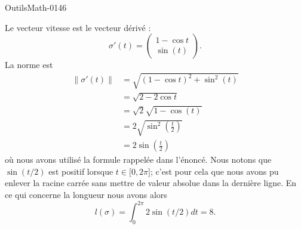 
\begin{corrige}{OutilsMath-0146}

    Le vecteur vitesse est le vecteur dérivé :
    \begin{equation}
        \sigma'(t)=\begin{pmatrix}
            1-\cos t    \\ 
            \sin(t)    
        \end{pmatrix}.
    \end{equation}
    La norme est
    \begin{subequations}
        \begin{align}
            \| \sigma'(t) \|&= \sqrt{(1-\cos t)^2+\sin^2(t)}\\
            &=\sqrt{2-2\cos t}\\
            &=\sqrt{2}\sqrt{1-\cos(t)}\\
            &=2\sqrt{\sin^2\left( \frac{ t }{ 2 } \right)}\\
            &=2\sin\left( \frac{ t }{2} \right)
        \end{align}
    \end{subequations}
    où nous avons utilisé la formule rappelée dans l'énoncé. Nous notons que \( \sin(t/2)\) est positif lorsque \( t\in\mathopen[ 0 , 2\pi \mathclose]\); c'est pour cela que nous avons pu enlever la racine carrée sans mettre de valeur absolue dans la dernière ligne. En ce qui concerne la longueur nous avons alors
    \begin{equation}
        l(\sigma)=\int_0^{2\pi}2\sin(t/2)dt=8.
    \end{equation}

\end{corrige}

